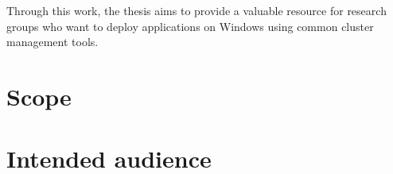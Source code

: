 \begin{comment}
Nevertheless, the benefits come with the price of required application changes and higher system requirements.

Because 
Microservice applications consist of multiple services where each service fulfills its specific task. They meet the requirements for 


Applications that are served on a cluster need to fulfill the corresponding architecture requirements for a cluster environment.  and they 

This thesis explores the design and development of an cluster for an microservice application.
With regards to the automation of steps.

The requirements for serving applications in a cluster are the underlying

 the dependency on external services is high. 

The application under study, \acf{OT}, is well prepared for a cluster deployment.

\ac{K8s} was mainly used on Linux systems in the past

 there is a growing need to deploy microservice applications on Windows platforms as well. 

The thesis examines the challenges involved in deploying such an application on Windows


The research field of cluster deployment with ContainerD is still in the beginning state for \ac{Windows}.
\end{comment}

Through this work, the thesis aims to provide a valuable resource for research groups who want to deploy applications on Windows using common cluster management tools.


\section{Scope}
\section{Intended audience}


